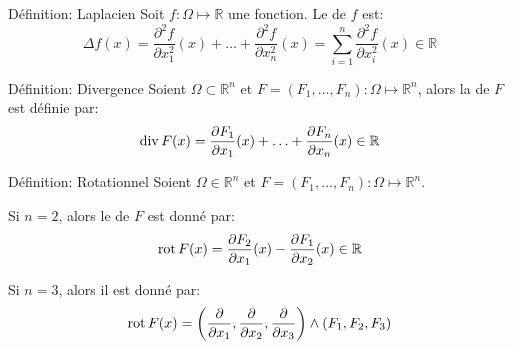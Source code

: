 \documentclass[a4paper]{article}
\begin{document}
\begin{parag}{Définition: Laplacien}
    Soit $f: \Omega \mapsto \mathbb{R}$ une fonction. Le  de $f$ est: 
    \[\Delta f\left(x\right) = \frac{\partial^{2} f}{\partial x_1^{2}}\left(x\right) + \ldots + \frac{\partial^{2} f}{\partial x_n^{2}}\left(x\right) = \sum_{i=1}^{n} \frac{\partial^{2} f}{\partial x_i^{2}}\left(x\right) \in \mathbb{R}\]
\end{parag}


\begin{parag}{Définition: Divergence}
    Soient $\Omega \subset \mathbb{R}^n$ et $F = \left(F_1, \ldots, F_n\right): \Omega \mapsto \mathbb{R}^n$, alors la  de $F$ est définie par:
    \[\Div F\left(x\right) = \frac{\partial F_1}{\partial x_1} \left(x\right) + \ldots + \frac{\partial F_n}{\partial x_n} \left(x\right) \in \mathbb{R}\]
\end{parag}


\begin{parag}{Définition: Rotationnel}
    Soient $\Omega \in \mathbb{R}^n$ et $F = \left(F_1, \ldots, F_n\right) : \Omega \mapsto \mathbb{R}^n$.

    Si $n = 2$, alors le  de $F$ est donné par: 
    \[\rot F\left(x\right) = \frac{\partial F_2}{\partial x_1} \left(x\right) - \frac{\partial F_1}{\partial x_2} \left(x\right) \in \mathbb{R}\]
    
    Si $n = 3$, alors il est donné par: 
    \[\rot F\left(x\right) = \left(\frac{\partial }{\partial x_1} , \frac{\partial }{\partial x_2} , \frac{\partial }{\partial x_3} \right) \wedge \left(F_1, F_2, F_3\right)\]
\end{parag}
\end{document}
